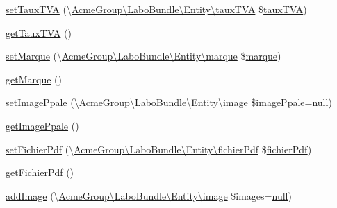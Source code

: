 \begin{DoxyCompactItemize}
\item 
\hyperlink{class_acme_group_1_1_labo_bundle_1_1_entity_1_1article_a9c71a427bcd9907b0350504c3d7e02b1}{set\+Taux\+T\+V\+A} (\textbackslash{}\hyperlink{class_acme_group_1_1_labo_bundle_1_1_entity_1_1taux_t_v_a}{Acme\+Group\textbackslash{}\+Labo\+Bundle\textbackslash{}\+Entity\textbackslash{}taux\+T\+V\+A} \$\hyperlink{class_acme_group_1_1_labo_bundle_1_1_entity_1_1taux_t_v_a}{taux\+T\+V\+A})
\item 
\hyperlink{class_acme_group_1_1_labo_bundle_1_1_entity_1_1article_ab4311d6553a38431db5ec2ae379fb9dc}{get\+Taux\+T\+V\+A} ()
\item 
\hyperlink{class_acme_group_1_1_labo_bundle_1_1_entity_1_1article_a1529034769ea6a784824ff4727359d23}{set\+Marque} (\textbackslash{}\hyperlink{class_acme_group_1_1_labo_bundle_1_1_entity_1_1marque}{Acme\+Group\textbackslash{}\+Labo\+Bundle\textbackslash{}\+Entity\textbackslash{}marque} \$\hyperlink{class_acme_group_1_1_labo_bundle_1_1_entity_1_1marque}{marque})
\item 
\hyperlink{class_acme_group_1_1_labo_bundle_1_1_entity_1_1article_ad1ddeb883fe86f2f6016fc86e8cd5156}{get\+Marque} ()
\item 
\hyperlink{class_acme_group_1_1_labo_bundle_1_1_entity_1_1article_a3c71857b1799c2c3c8b8d3da41e091db}{set\+Image\+Ppale} (\textbackslash{}\hyperlink{class_acme_group_1_1_labo_bundle_1_1_entity_1_1image}{Acme\+Group\textbackslash{}\+Labo\+Bundle\textbackslash{}\+Entity\textbackslash{}image} \$image\+Ppale=\hyperlink{validate_8js_afb8e110345c45e74478894341ab6b28e}{null})
\item 
\hyperlink{class_acme_group_1_1_labo_bundle_1_1_entity_1_1article_aafc19a8816d167f0b39eeff1a7bb6eee}{get\+Image\+Ppale} ()
\item 
\hyperlink{class_acme_group_1_1_labo_bundle_1_1_entity_1_1article_a309f51ed3a523eed7b29ccc9a3e81454}{set\+Fichier\+Pdf} (\textbackslash{}\hyperlink{class_acme_group_1_1_labo_bundle_1_1_entity_1_1fichier_pdf}{Acme\+Group\textbackslash{}\+Labo\+Bundle\textbackslash{}\+Entity\textbackslash{}fichier\+Pdf} \$\hyperlink{class_acme_group_1_1_labo_bundle_1_1_entity_1_1fichier_pdf}{fichier\+Pdf})
\item 
\hyperlink{class_acme_group_1_1_labo_bundle_1_1_entity_1_1article_a11e78ed6bcccffc13a0ef7d77428fc9e}{get\+Fichier\+Pdf} ()
\item 
\hyperlink{class_acme_group_1_1_labo_bundle_1_1_entity_1_1article_ad0585234c63b79a1754441f632f3f500}{add\+Image} (\textbackslash{}\hyperlink{class_acme_group_1_1_labo_bundle_1_1_entity_1_1image}{Acme\+Group\textbackslash{}\+Labo\+Bundle\textbackslash{}\+Entity\textbackslash{}image} \$images=\hyperlink{validate_8js_afb8e110345c45e74478894341ab6b28e}{null})

\end{DoxyCompactItemize}
